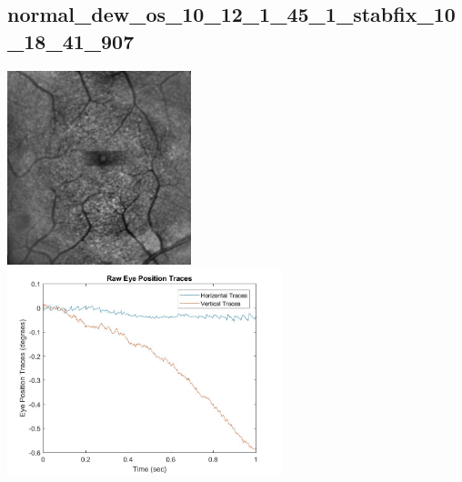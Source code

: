 \documentclass[11pt]{article}
\begin{document}
\subsection{normal\_dew\_os\_10\_12\_1\_45\_1\_stabfix\_10\_18\_41\_907}
\includegraphics[width=0.40\textwidth, valign=m]{referenceframes/tslo_normal/normal_dew_os_10_12_1_45_1_stabfix_10_18_41_907_dwt_nostim_gamscaled_bandfilt_refframe.jpg}
\includegraphics[width=0.60\textwidth, valign=m]{eyepositiontraces/tslo_normal/normal_dew_os_10_12_1_45_1_stabfix_10_18_41_907.jpg}\\
\end{document}
